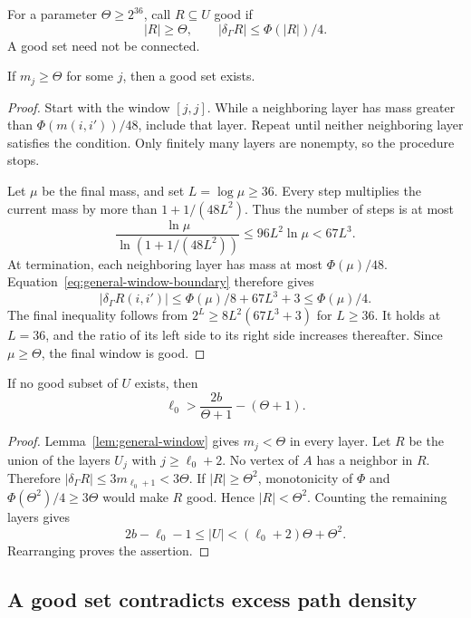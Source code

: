 For a parameter $\Theta\ge2^{36}$, call $R\subseteq U$ good if
\[
 |R|\ge\Theta,\qquad |\delta_\Gamma R|\le\Phi(|R|)/4.
\]
A good set need not be connected.

\begin{lemma}\label{lem:general-window}
If $m_j\ge\Theta$ for some $j$, then a good set exists.
\end{lemma}

\begin{proof}
Start with the window $[j,j]$.
While a neighboring layer has mass greater than $\Phi(m(i,i'))/48$, include that layer.
Repeat until neither neighboring layer satisfies the condition.
Only finitely many layers are nonempty, so the procedure stops.

Let $\mu$ be the final mass, and set $L=\log\mu\ge36$.
Every step multiplies the current mass by more than $1+1/(48L^2)$.
Thus the number of steps is at most
\[
 \frac{\ln\mu}{\ln(1+1/(48L^2))}
 \le96L^2\ln\mu<67L^3.
\]
At termination, each neighboring layer has mass at most $\Phi(\mu)/48$.
Equation~\eqref{eq:general-window-boundary} therefore gives
\[
 |\delta_\Gamma R(i,i')|
 \le\Phi(\mu)/8+67L^3+3\le\Phi(\mu)/4.
\]
The final inequality follows from
$2^L\ge8L^2(67L^3+3)$ for $L\ge36$.
It holds at $L=36$, and the ratio of its left side to its right side increases thereafter.
Since $\mu\ge\Theta$, the final window is good.
\end{proof}

\begin{lemma}\label{lem:general-layer-count}
If no good subset of $U$ exists, then
\[
 \ell_0>\frac{2b}{\Theta+1}-(\Theta+1).
\]
\end{lemma}

\begin{proof}
Lemma~\ref{lem:general-window} gives $m_j<\Theta$ in every layer.
Let $R$ be the union of the layers $U_j$ with $j\ge\ell_0+2$.
No vertex of $A$ has a neighbor in $R$.
Therefore $|\delta_\Gamma R|\le3m_{\ell_0+1}<3\Theta$.
If $|R|\ge\Theta^2$, monotonicity of $\Phi$ and $\Phi(\Theta^2)/4\ge3\Theta$ would make $R$ good.
Hence $|R|<\Theta^2$.
Counting the remaining layers gives
\[
 2b-\ell_0-1\le|U|<(\ell_0+2)\Theta+\Theta^2.
\]
Rearranging proves the assertion.
\end{proof}

\subsection{A good set contradicts excess path density}

